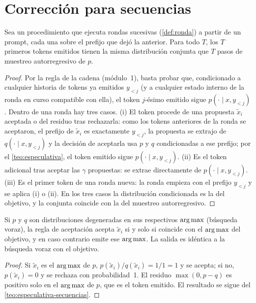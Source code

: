 \section{Corrección para secuencias}

\begin{teorema}\label{teo:especulativa-secuencias}
Sea un procedimiento que ejecuta rondas sucesivas (\cref{def:ronda}) a partir de un prompt, cada una sobre el prefijo que dejó la anterior. Para todo $T$, los $T$ primeros tokens emitidos tienen la misma distribución conjunta que $T$ pasos de muestreo autorregresivo de $p$.
\end{teorema}

\begin{proof}
Por la regla de la cadena (módulo~1), basta probar que, condicionado a cualquier historia de tokens ya emitidos $y_{<j}$ (y a cualquier estado interno de la ronda en curso compatible con ella), el token $j$-ésimo emitido sigue $p(\cdot\mid x,y_{<j})$. Dentro de una ronda hay tres casos. (i) El token procede de una propuesta $\tilde x_i$ aceptada o del residuo tras rechazarla: como los tokens anteriores de la ronda se aceptaron, el prefijo de $\tilde x_i$ es exactamente $y_{<j}$, la propuesta se extrajo de $q(\cdot\mid x,y_{<j})$ y la decisión de aceptarla usa $p$ y $q$ condicionadas a ese prefijo; por el \cref{teo:especulativa}, el token emitido sigue $p(\cdot\mid x,y_{<j})$. (ii) Es el token adicional tras aceptar las $\gamma$ propuestas: se extrae directamente de $p(\cdot\mid x,y_{<j})$. (iii) Es el primer token de una ronda nueva: la ronda empieza con el prefijo $y_{<j}$ y se aplica (i) o (ii). En los tres casos la distribución condicionada es la del objetivo, y la conjunta coincide con la del muestreo autorregresivo.
\end{proof}

\begin{corolario}\label{cor:voraz}
Si $p$ y $q$ son distribuciones degeneradas en sus respectivos $\operatorname*{arg\,max}$ (búsqueda voraz), la regla de aceptación acepta $\tilde x_i$ si y solo si coincide con el $\operatorname*{arg\,max}$ del objetivo, y en caso contrario emite ese $\operatorname*{arg\,max}$. La salida es idéntica a la búsqueda voraz con el objetivo.
\end{corolario}

\begin{proof}
Si $\tilde x_i$ es el $\operatorname*{arg\,max}$ de $p$, $p(\tilde x_i)/q(\tilde x_i)=1/1=1$ y se acepta; si no, $p(\tilde x_i)=0$ y se rechaza con probabilidad~1. El residuo $\max(0,p-q)$ es positivo solo en el $\operatorname*{arg\,max}$ de $p$, que es el token emitido. El resultado se sigue del \cref{teo:especulativa-secuencias}.
\end{proof}

